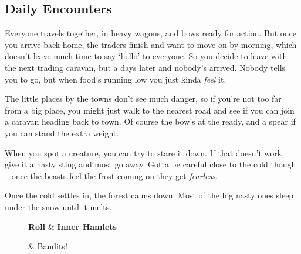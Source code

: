 \begin{multicols}{2}

\subsection{Daily Encounters}

\begin{speechtext}
  Everyone travels together, in heavy wagons, and bows ready for action.
  But once you arrive back home, the traders finish and want to move on by morning, which doesn't leave much time to say `hello' to everyone.
  So you decide to leave with the next trading caravan, but a days later and nobody's arrived.
  Nobody tells you to go, but when food's running low you just kinda \emph{feel} it.

  The little places by the towns don't see much danger, so if you're not too far from a big place, you might just walk to the nearest road and see if you can join a caravan heading back to town.
  Of course the bow's at the ready, and a spear if you can stand the extra weight.

  When you spot a creature, you can try to stare it down.
  If that doesn't work, give it a nasty sting and most go away.
  Gotta be careful close to the cold though -- once the beasts feel the frost coming on they get \emph{fearless}.

  Once the cold settles in, the forest calms down.
  Most of the big nasty ones sleep under the snow until it melts.
\end{speechtext}


\begin{figure*}[b!]

\begin{multicols}{3}
\small
\setcounter{enc}{15}
\setcounter{diceNo}{13}
\vspace{2em}
\noindent
\begin{boxtable}[c|L]
  \hline
  \hline
  \textbf{Roll} & \textbf{Inner Hamlets} \\
  \hline
  \hline
  \addtocounter{diceNo}{-1}
  \addtocounter{enc}{-1}
   & Bandits! \\
  \hline
  \hline
\end{boxtable}


\end{multicols}
\end{figure*}
\end{multicols}
